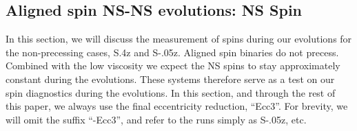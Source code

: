 \documentclass[aps,prd,amsmath,floatfix
,twocolumn
,superscriptaddress,nofootinbib,showpacs]{revtex4-1}
\theoremstyle{plain} \newtheorem{thm}{Theorem} \newtheorem{lem}{Lemma}
\begin{document}



\subsection{Aligned spin NS-NS evolutions: NS Spin}
\label{sec:EvolutionSpin}

In this section, we will discuss the measurement of spins during our
evolutions for the non-precessing cases, S.4z and S-.05z.  Aligned
spin binaries do not precess.  Combined with the low viscosity we
expect the NS spins to stay approximately constant during the
evolutions.  These systems therefore serve as a test on our spin
diagnostics during the evolutions.
In this section, and through the rest of this paper, we always use the
final eccentricity reduction, ``Ecc3''.  For brevity, we will omit the
suffix ``-Ecc3'', and refer to the runs simply as S-.05z, etc.
\end{document}
